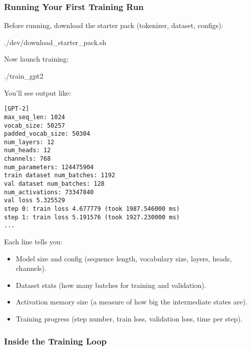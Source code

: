 \documentclass[
  letterpaper,
  DIV=11,
  numbers=noendperiod]{scrreprt}
\newenvironment{Shaded}{\begin{snugshade}}{\end{snugshade}}
\newcommand{\ExtensionTok}[1]{\textcolor[rgb]{0.00,0.23,0.31}{#1}}
\providecommand{\tightlist}{%
  \setlength{\itemsep}{0pt}\setlength{\parskip}{0pt}}
\begin{document}
\subsubsection{Running Your First Training
Run}\label{running-your-first-training-run}

Before running, download the starter pack (tokenizer, dataset, configs):

\begin{Shaded}
\begin{Highlighting}[]
\ExtensionTok{./dev/download\_starter\_pack.sh}
\end{Highlighting}
\end{Shaded}

Now launch training:

\begin{Shaded}
\begin{Highlighting}[]
\ExtensionTok{./train\_gpt2}
\end{Highlighting}
\end{Shaded}

You'll see output like:

\begin{verbatim}
[GPT-2]
max_seq_len: 1024
vocab_size: 50257
padded_vocab_size: 50304
num_layers: 12
num_heads: 12
channels: 768
num_parameters: 124475904
train dataset num_batches: 1192
val dataset num_batches: 128
num_activations: 73347840
val loss 5.325529
step 0: train loss 4.677779 (took 1987.546000 ms)
step 1: train loss 5.191576 (took 1927.230000 ms)
...
\end{verbatim}

Each line tells you:

\begin{itemize}
\tightlist
\item
  Model size and config (sequence length, vocabulary size, layers,
  heads, channels).
\item
  Dataset stats (how many batches for training and validation).
\item
  Activation memory size (a measure of how big the intermediate states
  are).
\item
  Training progress (step number, train loss, validation loss, time per
  step).
\end{itemize}

\subsubsection{Inside the Training Loop}\label{inside-the-training-loop}
\end{document}
